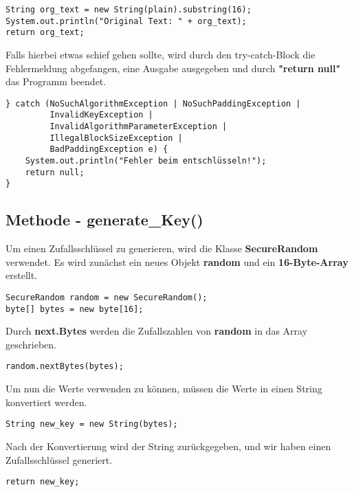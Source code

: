 \documentclass[12pt]{article}
\begin{document}
\begin{lstlisting}
String org_text = new String(plain).substring(16);
System.out.println("Original Text: " + org_text);
return org_text;
\end{lstlisting}
\newpage
Falls hierbei etwas schief gehen sollte, wird durch den try-catch-Block die Fehlermeldung abgefangen, eine Ausgabe ausgegeben und durch \textbf{"return null"} das Programm beendet.
\begin{lstlisting}
} catch (NoSuchAlgorithmException | NoSuchPaddingException | 
         InvalidKeyException | 
         InvalidAlgorithmParameterException |
         IllegalBlockSizeException |
	     BadPaddingException e) {
	System.out.println("Fehler beim entschlüsseln!");	
	return null;
}
\end{lstlisting}

\subsection{Methode - generate\_Key()}
Um einen Zufallsschlüssel zu generieren, wird die Klasse \textbf{SecureRandom} verwendet. Es wird zunächst ein neues Objekt \textbf{random} und ein \textbf{16-Byte-Array} erstellt.
\begin{lstlisting}
SecureRandom random = new SecureRandom();
byte[] bytes = new byte[16]; 
\end{lstlisting}
Durch \textbf{next.Bytes} werden die Zufallszahlen von \textbf{random} in das Array geschrieben.
\begin{lstlisting}
random.nextBytes(bytes);
\end{lstlisting}
Um nun die Werte verwenden zu können, müssen die Werte in einen String konvertiert werden.
\begin{lstlisting}
String new_key = new String(bytes);
\end{lstlisting}
Nach der Konvertierung wird der String zurückgegeben, und wir haben einen Zufallsschlüssel generiert.
\begin{lstlisting}
return new_key;
\end{lstlisting}
\newpage
\end{document}
